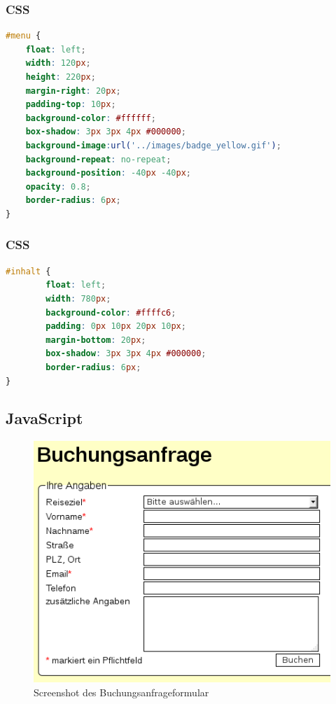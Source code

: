 \documentclass[xcolor=dvipsnames]{beamer}
\begin{document}
\begin{frame}[fragile]
\frametitle{CSS}

\begin{lstlisting}[language=CSS, firstnumber=12]
#menu {
    float: left;
    width: 120px;
    height: 220px;
    margin-right: 20px;
    padding-top: 10px;
    background-color: #ffffff;
    box-shadow: 3px 3px 4px #000000;
    background-image:url('../images/badge_yellow.gif');
    background-repeat: no-repeat;
    background-position: -40px -40px;
    opacity: 0.8;
    border-radius: 6px;
}
\end{lstlisting}
\end{frame}

\begin{frame}[fragile]
\frametitle{CSS}

\begin{lstlisting}[language=CSS, firstnumber=51]
#inhalt {
        float: left;
        width: 780px;
        background-color: #ffffc6;
        padding: 0px 10px 20px 10px;
        margin-bottom: 20px;
        box-shadow: 3px 3px 4px #000000;
        border-radius: 6px;
}

\end{lstlisting}
\end{frame}


\subsection{JavaScript}
\begin{frame} %
	\begin{figure}
	\includegraphics[scale=0.5]{screenshot_buchung.png}
	\caption{Screenshot des Buchungsanfrageformular}
	\end{figure}
\end{frame}
\end{document}
